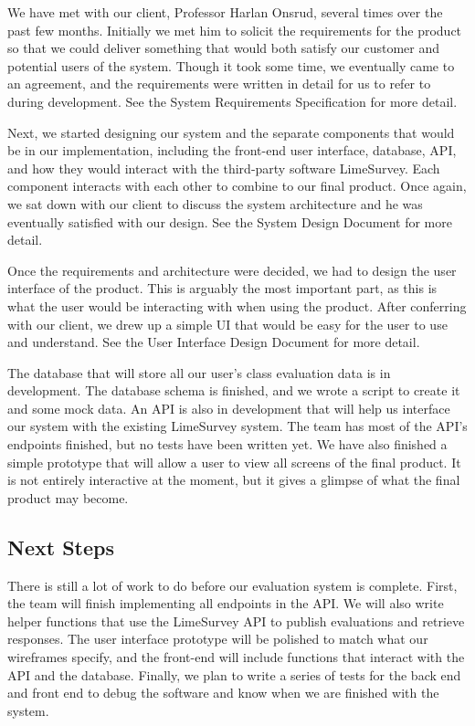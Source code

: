 \documentclass{article}
\begin{document}
We have met with our client, Professor Harlan Onsrud, several times over the past few months. Initially we met him to solicit the requirements for the product so that we could deliver something that would both satisfy our customer and potential users of the system. Though it took some time, we eventually came to an agreement, and the requirements were written in detail for us to refer to during development. See the System Requirements Specification for more detail.
	
Next, we started designing our system and the separate components that would be in our implementation, including the front-end user interface, database, API, and how they would interact with the third-party software LimeSurvey. Each component interacts with each other to combine to our final product. Once again, we sat down with our client to discuss the system architecture and he was eventually satisfied with our design. See the System Design Document for more detail.

Once the requirements and architecture were decided, we had to design the user interface of the product. This is arguably the most important part, as this is what the user would be interacting with when using the product. After conferring with our client, we drew up a simple UI that would be easy for the user to use and understand. See the User Interface Design Document for more detail.

The database that will store all our user's class evaluation data is in development. The database schema is finished, and we wrote a script to create it and some mock data. An API is also in development that will help us interface our system with the existing LimeSurvey system. The team has most of the API's endpoints finished, but no tests have been written yet. We have also finished a simple prototype that will allow a user to view all screens of the final product. It is not entirely interactive at the moment, but it gives a glimpse of what the final product may become.

\subsection{Next Steps}

There is still a lot of work to do before our evaluation system is complete. First, the team will finish implementing all endpoints in the API. We will also write helper functions that use the LimeSurvey API to publish evaluations and retrieve responses. The user interface prototype will be polished to match what our wireframes specify, and the front-end will include functions that interact with the API and the database. Finally, we plan to write a series of tests for the back end and front end to debug the software and know when we are finished with the system.
\end{document}
